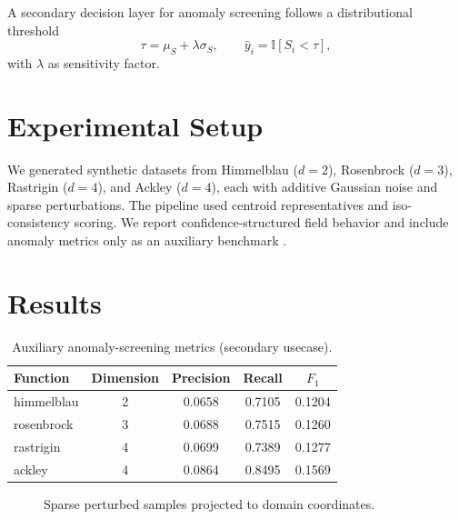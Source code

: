 ﻿\documentclass[conference]{IEEEtran}
\begin{document}
A secondary decision layer for anomaly screening follows a distributional threshold
\begin{equation}
\tau = \mu_S + \lambda\sigma_S, \qquad \hat{y}_i=\mathbb{I}[S_i<\tau],
\end{equation}
with $\lambda$ as sensitivity factor.

\section{Experimental Setup}
We generated synthetic datasets from Himmelblau ($d=2$), Rosenbrock ($d=3$), Rastrigin ($d=4$), and Ackley ($d=4$), each with additive Gaussian noise and sparse perturbations. The pipeline used centroid representatives and iso-consistency scoring. We report confidence-structured field behavior and include anomaly metrics only as an auxiliary benchmark \cite{fawcett2006,saito2015}.

\section{Results}
\begin{table}[t]
\caption{Auxiliary anomaly-screening metrics (secondary usecase).}
\centering
\begin{tabular}{lcccc}
\toprule
Function & Dimension & Precision & Recall & $F_1$ \\
\midrule
himmelblau & 2 & 0.0658 & 0.7105 & 0.1204 \\
rosenbrock & 3 & 0.0688 & 0.7515 & 0.1260 \\
rastrigin & 4 & 0.0699 & 0.7389 & 0.1277 \\
ackley & 4 & 0.0864 & 0.8495 & 0.1569 \\
\bottomrule
\end{tabular}
\end{table}

\begin{figure}[t]
\centering
{}
\caption{Sparse perturbed samples projected to domain coordinates.}
\end{figure}
\end{document}
